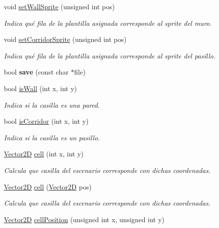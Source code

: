 \begin{DoxyCompactItemize}
\item 
void \hyperlink{class_scenario_a264bcbcfb4cf26c79fcd0bb92e6a6991}{set\-Wall\-Sprite} (unsigned int pos)
\begin{DoxyCompactList}\small\item\em Indica qué fila de la plantilla asignada corresponde al sprite del muro. \end{DoxyCompactList}\item 
void \hyperlink{class_scenario_a5a16a90c0b3bbccc8b79316a159631ec}{set\-Corridor\-Sprite} (unsigned int pos)
\begin{DoxyCompactList}\small\item\em Indica qué fila de la plantilla asignada corresponde al sprite del pasillo. \end{DoxyCompactList}\item 
\hypertarget{class_scenario_abc3b44c28bf74a91f9e7a052f8010269}{bool {\bfseries save} (const char $\ast$file)}\label{class_scenario_abc3b44c28bf74a91f9e7a052f8010269}

\item 
bool \hyperlink{class_scenario_ab0df7d43602535a535b30db82115c912}{is\-Wall} (int x, int y)
\begin{DoxyCompactList}\small\item\em Indica si la casilla es una pared. \end{DoxyCompactList}\item 
bool \hyperlink{class_scenario_ac55d32b9280231f5f3c608b88fb79222}{is\-Corridor} (int x, int y)
\begin{DoxyCompactList}\small\item\em Indica si la casilla es un pasillo. \end{DoxyCompactList}\item 
\hyperlink{class_vector2_d}{Vector2\-D} \hyperlink{class_scenario_ad48f84e44fef3ae985cdd3245acf065d}{cell} (int x, int y)
\begin{DoxyCompactList}\small\item\em Calcula que casilla del escenario corresponde con dichas coordenadas. \end{DoxyCompactList}\item 
\hyperlink{class_vector2_d}{Vector2\-D} \hyperlink{class_scenario_a7164ece5fdfe79405863ebed3590fb0d}{cell} (\hyperlink{class_vector2_d}{Vector2\-D} pos)
\begin{DoxyCompactList}\small\item\em Calcula que casilla del escenario corresponde con dichas coordenadas. \end{DoxyCompactList}\item 
\hypertarget{class_scenario_a3a0f6033d2652feb47b69d9838af31b0}{\hyperlink{class_vector2_d}{Vector2\-D} \hyperlink{class_scenario_a3a0f6033d2652feb47b69d9838af31b0}{cell\-Position} (unsigned int x, unsigned int y)}\label{class_scenario_a3a0f6033d2652feb47b69d9838af31b0}


\end{DoxyCompactItemize}
